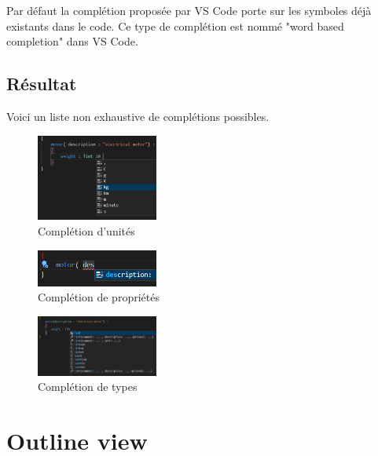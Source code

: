 \documentclass[
    iict, %
    il, %
]{heig-tb}
\begin{document}
Par défaut la complétion proposée par VS Code porte sur les symboles déjà existants dans le code.
Ce type de complétion est nommé "word based completion" dans VS Code.

\subsection{Résultat}

Voici un liste non exhaustive de complétions possibles.

\begin{figure}[H]
    \begin{center}
        \includegraphics[width=4cm]{assets/figures/completion.PNG}
    \end{center}
    \caption[Complétion d'unités]{\label{unit-completion} Complétion d'unités}
\end{figure}

\begin{figure}[H]
    \begin{center}
        \includegraphics[width=4cm]{assets/figures/property-completion.PNG}
    \end{center}
    \caption[Complétion de propriétés]{\label{property-completion} Complétion de propriétés}
\end{figure}

\begin{figure}[H]
    \begin{center}
        \includegraphics[width=4cm]{assets/figures/type-completion.PNG}
    \end{center}
    \caption[Complétion de types]{\label{type-completion} Complétion de types}
\end{figure}


\section{Outline view}
\end{document}
